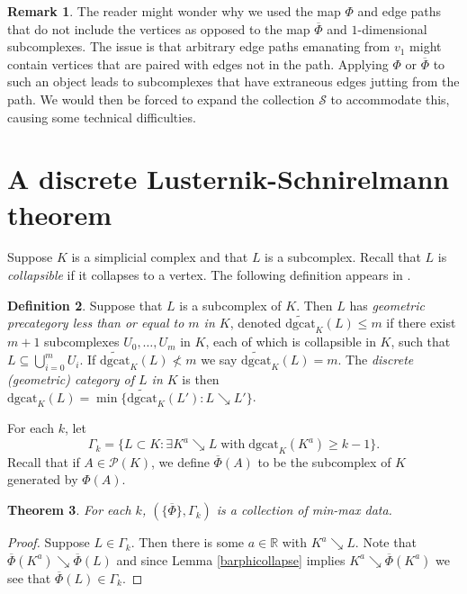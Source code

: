 \documentclass[11pt]{amsart}
\newtheorem{theorem}{Theorem}[section]
\theoremstyle{definition}
\newtheorem{definition}[theorem]{Definition}
\newtheorem{remark}[theorem]{Remark}
\newcommand{\zr}{{\mathbb R}}
\begin{document}
\begin{remark}
The reader might wonder why we used the map $\Phi$ and edge paths that do not include the vertices as opposed to the map $\overline{\Phi}$ and $1$-dimensional subcomplexes. The issue is that arbitrary edge paths emanating from $v_1$ might contain vertices that are paired with edges not in the path. Applying $\Phi$ or $\overline{\Phi}$ to such an object leads to subcomplexes that have extraneous edges jutting from the path. We would then be forced to expand the collection ${\mathcal S}$ to accommodate this, causing some technical difficulties.
\end{remark}



\section{A discrete Lusternik-Schnirelmann theorem}\label{lscat}
Suppose $K$ is a simplicial complex and that $L$ is a subcomplex. Recall that $L$ is {\em collapsible} if it collapses to a vertex. The following definition appears in \cite{scoville}.

\begin{definition} Suppose that $L$ is a subcomplex of $K$. Then $L$ has {\em geometric precategory less than or equal to $m$ in $K$}, denoted $\widetilde{\text{dgcat}}_K(L)\le m$ if there exist $m+1$ subcomplexes $U_0,\dots, U_m$ in $K$, each of which is collapsible in $K$, such that $L\subseteq\bigcup_{i=0}^m U_i$. If $\widetilde{\text{dgcat}}_K(L)\not< m$ we say $\widetilde{\text{dgcat}}_K(L) = m$. The {\em discrete {\em (}geometric{\em )} category of $L$ in $K$} is then $\text{dgcat}_K(L) = \min\{\widetilde{\text{dgcat}}_K(L'): L\searrow L'\}$.
\end{definition}

For each $k$, let $$\Gamma_k=\{L\subset K: \exists K^a\searrow L\;\text{with}\; \text{dgcat}_K(K^a)\ge k-1\}.$$ Recall that if $A\in{\mathcal P}(K)$, we define $\overline{\Phi}(A)$ to be the subcomplex of $K$ generated by $\Phi(A)$.

\begin{theorem} For each $k$, $(\{\overline{\Phi}\},\Gamma_k)$ is a collection of min-max data.
\end{theorem}

\begin{proof}
Suppose $L\in\Gamma_k$. Then there is some $a\in\zr$ with $K^a\searrow L$. Note that $\overline{\Phi}(K^a)\searrow \overline{\Phi}(L)$ and since Lemma \ref{barphicollapse} implies $K^a\searrow \overline{\Phi}(K^a)$  we see that $\overline{\Phi}(L)\in\Gamma_k$.
\end{proof}
\end{document}
